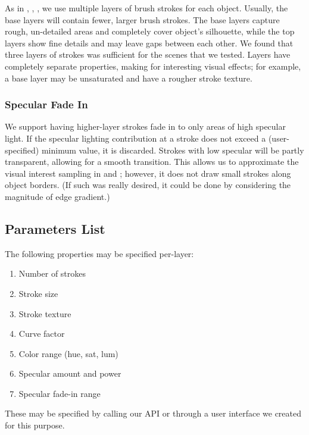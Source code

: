 \documentclass[conference]{acmsiggraph}
\begin{document}
As in \cite{Hertzmann:1998:PRC:280814.280951},
\cite{Meier:1996:PRA:237170.237288}, \cite{Lu:2010:IPS:1730804.1730825}, we use
multiple layers of brush strokes for each object. Usually, the base layers will
contain fewer, larger brush strokes. The base layers capture rough, un-detailed
areas and completely cover object's silhouette, while the top layers show fine
details and may leave gaps between each other. We found that three layers of
strokes was sufficient for the scenes that we tested. Layers have completely
separate properties, making for interesting visual effects; for example, a base
layer may be unsaturated and have a rougher stroke texture.

\subsubsection{Specular Fade In}

We support having higher-layer strokes fade in to only areas of high specular
light. If the specular lighting contribution at a stroke does not exceed a
(user-specified) minimum value, it is discarded. Strokes with low specular will
be partly transparent, allowing for a smooth transition. This allows us to
approximate the visual interest sampling in
\cite{Hertzmann:1998:PRC:280814.280951} and \cite{Lu:2010:IPS:1730804.1730825};
however, it does not draw small strokes along object borders. (If such was
really desired, it could be done by considering the magnitude of edge
gradient.)


\subsection{Parameters List}

The following properties may be specified per-layer:

\begin{enumerate}
  \item Number of strokes
  \item Stroke size
  \item Stroke texture
  \item Curve factor
  \item Color range (hue, sat, lum)
  \item Specular amount and power
  \item Specular fade-in range
\end{enumerate}

These may be specified by calling our API or through a user interface we
created for this purpose.
\end{document}
